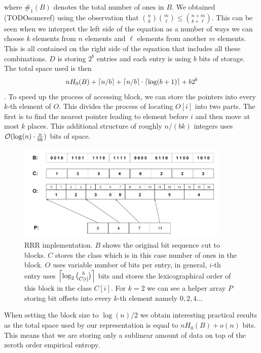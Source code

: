 where $\#_1(B)$ denotes the total number of ones in $B$. We obtained (TODOsomeref) using the
observation that ${n\choose k} {m\choose \ell} \leq {n+m\choose k+\ell}$. This can be seen
when we interpret the left side of the equation as a number of ways we can choose $k$ elements
from $n$ elements and $\ell$ elements from another $m$ elements. This is all contained on the
right side of the equation that includes all these combinations. $D$ is storing $2^b$ entries
and each entry is using $b$ bits of storage. The total space used is then
$$nH_0(B) + \left\lceil n/b \right\rceil + \left\lceil n/b \right\rceil \cdot \left\lceil \log(b+1) \right\rceil + b2^b$$. To speed up the process
of accessing block, we can store the pointers into every $k$-th element of $O$. This divides
the process of locating $O[i]$ into two parts. The first is to find the nearest pointer leading
to element before $i$ and then move at most $k$ places. This additional structure of roughly
$n/(bk)$ integers uses $\mathcal{O}(\log(n)\cdot \frac{n}{bk})$ bits of space.

\begin{figure}
	\centerline{
		\includegraphics[width=0.9\textwidth, height=0.3\textheight]{images/rrr}
	}
	\caption[TODO]{RRR implementation. $B$ shows the original bit sequence cut to
    blocks. $C$ stores the class which is in this case number of ones in the block.
    $O$ uses variable number of bits per entry, in general, $i$-th entry uses
    $\left\lceil \log_2{b\choose C[i]} \right\rceil$ bits and stores the lexicographical order
    of this block in the class $C[i]$. For $k=2$ we can see a helper array $P$
    storing bit offsets into every $k$-th element namely $0, 2, 4\ldots$
	}
	\label{obr:RRRFinal}
\end{figure}

When setting the block size to $\log(n)/2$ we obtain interesting practical results as
the total space used by our representation is equal to $nH_0(B) + o(n)$ bits. This means
that we are storing only a sublinear amount of data on top of the zeroth order empirical entropy.

